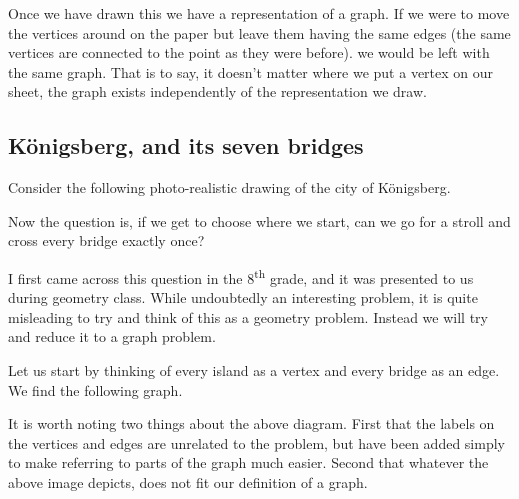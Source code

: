 \documentclass{article}
\begin{document}
Once we have drawn this we have a representation of a graph. If we were to move the vertices around on the paper but leave them having the same edges (the same vertices are connected to the point as they were before). we would be left with the same graph. That is to say, it doesn't matter where we put a vertex on our sheet, the graph exists independently of the representation we draw.

\subsection{K\"onigsberg, and its seven bridges}

Consider the following photo-realistic drawing of the city of K\"onigsberg.



Now the question is, if we get to choose where we start, can we go for a stroll and cross every bridge exactly once?

I first came across this question in the 8\textsuperscript{th} grade, and it was presented to us during geometry class. While undoubtedly an interesting problem, it is quite misleading to try and think of this as a geometry problem. Instead we will try and reduce it to a graph problem.

Let us start by thinking of every island as a vertex and every bridge as an edge. We find the following graph.

\begin{center}
\end{center}

It is worth noting two things about the above diagram. First that the labels on the vertices and edges are unrelated to the problem, but have been added simply to make referring to parts of the graph much easier. Second that whatever the above image depicts, does not fit our definition of a graph.
\end{document}
